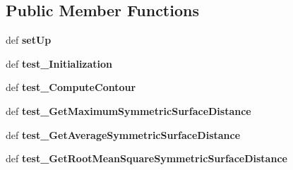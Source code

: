 \subsection*{Public Member Functions}
\begin{DoxyCompactItemize}
\item 
\hypertarget{classmedpy_1_1tests_1_1metric_1_1Surface_1_1TestSurfaceClass_a103d826711c85105e3a9b5c51716b254}{
def {\bfseries setUp}}
\label{classmedpy_1_1tests_1_1metric_1_1Surface_1_1TestSurfaceClass_a103d826711c85105e3a9b5c51716b254}

\item 
\hypertarget{classmedpy_1_1tests_1_1metric_1_1Surface_1_1TestSurfaceClass_a5c9954cb59e13a6d026c7a1aae41205f}{
def {\bfseries test\_\-Initialization}}
\label{classmedpy_1_1tests_1_1metric_1_1Surface_1_1TestSurfaceClass_a5c9954cb59e13a6d026c7a1aae41205f}

\item 
\hypertarget{classmedpy_1_1tests_1_1metric_1_1Surface_1_1TestSurfaceClass_a7a6b072bf4d343c9b5aca834f81df880}{
def {\bfseries test\_\-ComputeContour}}
\label{classmedpy_1_1tests_1_1metric_1_1Surface_1_1TestSurfaceClass_a7a6b072bf4d343c9b5aca834f81df880}

\item 
\hypertarget{classmedpy_1_1tests_1_1metric_1_1Surface_1_1TestSurfaceClass_afce12e6ac335ad46e416a67c08b27dee}{
def {\bfseries test\_\-GetMaximumSymmetricSurfaceDistance}}
\label{classmedpy_1_1tests_1_1metric_1_1Surface_1_1TestSurfaceClass_afce12e6ac335ad46e416a67c08b27dee}

\item 
\hypertarget{classmedpy_1_1tests_1_1metric_1_1Surface_1_1TestSurfaceClass_a996ebeccc46c7b81b18a9523ed20a3dc}{
def {\bfseries test\_\-GetAverageSymmetricSurfaceDistance}}
\label{classmedpy_1_1tests_1_1metric_1_1Surface_1_1TestSurfaceClass_a996ebeccc46c7b81b18a9523ed20a3dc}

\item 
\hypertarget{classmedpy_1_1tests_1_1metric_1_1Surface_1_1TestSurfaceClass_a01d1f751f5f0eac65897a844a52dc367}{
def {\bfseries test\_\-GetRootMeanSquareSymmetricSurfaceDistance}}
\label{classmedpy_1_1tests_1_1metric_1_1Surface_1_1TestSurfaceClass_a01d1f751f5f0eac65897a844a52dc367}

\end{DoxyCompactItemize}
